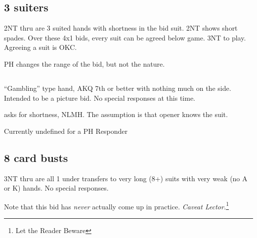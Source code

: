 \documentclass[main]{subfile}
\begin{document}
	\subsection{3 suiters}
	
	2NT thru  are 3 suited hands with shortness in the bid suit. 2NT shows short spades. Over these 4x1 bids, every suit can be agreed below game. 3NT to play.  Agreeing a suit is OKC.
	
	PH changes the range of the bid, but not the nature.
		
	\subsection[3S]{}
	
	``Gambling'' type hand, AKQ 7th or better with nothing much on the side. Intended to be a picture bid. No special responses at this time. 

	 asks for shortness, NLMH.  The assumption is that opener knows the suit. 
	
	Currently undefined for a PH Responder
	
	\subsection{8 card busts}
	
	3NT thru  are all 1 under transfers to very long (8+) suits with very weak (no A or K) hands. No special responses.
	
	Note that this bid has \textit{never} actually come up in practice.  \textit{Caveat Lector.}\footnote{Let the Reader Beware}
\end{document}
